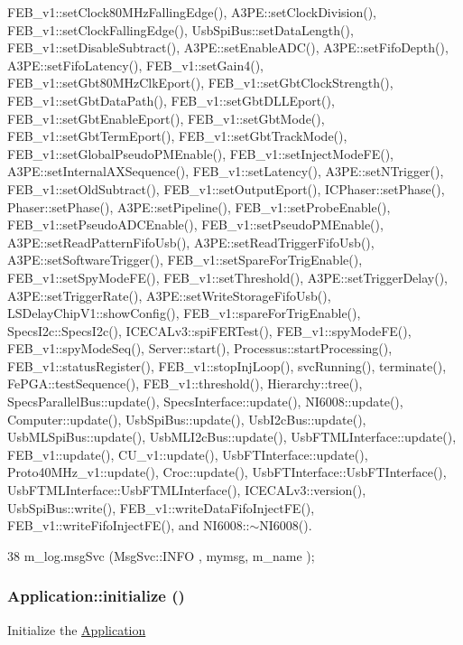FEB\_\-v1::setClock80MHzFallingEdge(), A3PE::setClockDivision(), FEB\_\-v1::setClockFallingEdge(), UsbSpiBus::setDataLength(), FEB\_\-v1::setDisableSubtract(), A3PE::setEnableADC(), A3PE::setFifoDepth(), A3PE::setFifoLatency(), FEB\_\-v1::setGain4(), FEB\_\-v1::setGbt80MHzClkEport(), FEB\_\-v1::setGbtClockStrength(), FEB\_\-v1::setGbtDataPath(), FEB\_\-v1::setGbtDLLEport(), FEB\_\-v1::setGbtEnableEport(), FEB\_\-v1::setGbtMode(), FEB\_\-v1::setGbtTermEport(), FEB\_\-v1::setGbtTrackMode(), FEB\_\-v1::setGlobalPseudoPMEnable(), FEB\_\-v1::setInjectModeFE(), A3PE::setInternalAXSequence(), FEB\_\-v1::setLatency(), A3PE::setNTrigger(), FEB\_\-v1::setOldSubtract(), FEB\_\-v1::setOutputEport(), ICPhaser::setPhase(), Phaser::setPhase(), A3PE::setPipeline(), FEB\_\-v1::setProbeEnable(), FEB\_\-v1::setPseudoADCEnable(), FEB\_\-v1::setPseudoPMEnable(), A3PE::setReadPatternFifoUsb(), A3PE::setReadTriggerFifoUsb(), A3PE::setSoftwareTrigger(), FEB\_\-v1::setSpareForTrigEnable(), FEB\_\-v1::setSpyModeFE(), FEB\_\-v1::setThreshold(), A3PE::setTriggerDelay(), A3PE::setTriggerRate(), A3PE::setWriteStorageFifoUsb(), LSDelayChipV1::showConfig(), FEB\_\-v1::spareForTrigEnable(), SpecsI2c::SpecsI2c(), ICECALv3::spiFERTest(), FEB\_\-v1::spyModeFE(), FEB\_\-v1::spyModeSeq(), Server::start(), Processus::startProcessing(), FEB\_\-v1::statusRegister(), FEB\_\-v1::stopInjLoop(), svcRunning(), terminate(), FePGA::testSequence(), FEB\_\-v1::threshold(), Hierarchy::tree(), SpecsParallelBus::update(), SpecsInterface::update(), NI6008::update(), Computer::update(), UsbSpiBus::update(), UsbI2cBus::update(), UsbMLSpiBus::update(), UsbMLI2cBus::update(), UsbFTMLInterface::update(), FEB\_\-v1::update(), CU\_\-v1::update(), UsbFTInterface::update(), Proto40MHz\_\-v1::update(), Croc::update(), UsbFTInterface::UsbFTInterface(), UsbFTMLInterface::UsbFTMLInterface(), ICECALv3::version(), UsbSpiBus::write(), FEB\_\-v1::writeDataFifoInjectFE(), FEB\_\-v1::writeFifoInjectFE(), and NI6008::$\sim$NI6008().


\begin{DoxyCode}
38 { m_log.msgSvc (MsgSvc::INFO    , mymsg, m_name ); }
\end{DoxyCode}
\hypertarget{classApplication_a86b8cbb104f3e04516ef574e5822ff82}{
\subsubsection[{initialize}]{ Application::initialize ()}}
\label{classApplication_a86b8cbb104f3e04516ef574e5822ff82}
Initialize the \hyperlink{classApplication}{Application} 

